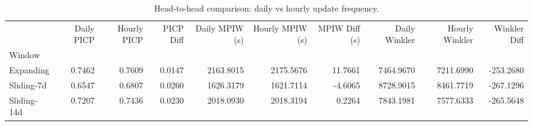 \begin{table}
\caption{Head-to-head comparison: daily vs hourly update frequency.}
\label{tab:t5b4_daily_vs_hourly}
\begin{tabular}{lrrrrrrrrr}
\toprule
 & Daily PICP & Hourly PICP & PICP Diff & Daily MPIW (s) & Hourly MPIW (s) & MPIW Diff (s) & Daily Winkler & Hourly Winkler & Winkler Diff \\
Window &  &  &  &  &  &  &  &  &  \\
\midrule
Expanding & 0.7462 & 0.7609 & 0.0147 & 2163.8015 & 2175.5676 & 11.7661 & 7464.9670 & 7211.6990 & -253.2680 \\
Sliding-7d & 0.6547 & 0.6807 & 0.0260 & 1626.3179 & 1621.7114 & -4.6065 & 8728.9015 & 8461.7719 & -267.1296 \\
Sliding-14d & 0.7207 & 0.7436 & 0.0230 & 2018.0930 & 2018.3194 & 0.2264 & 7843.1981 & 7577.6333 & -265.5648 \\
\bottomrule
\end{tabular}
\end{table}
